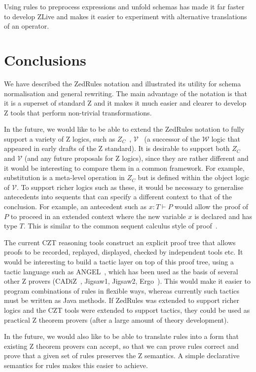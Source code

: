 \documentclass{entcs}
\newcommand{\V}{\mathcal{V}}
\newcommand{\Zc}{Z_C}
\begin{document}
Using rules to preprocess expressions and unfold schemas has made it
far faster to develop ZLive and makes it easier to experiment with
alternative translations of an operator.




\section{Conclusions} \label{sec:concl}

We have described the ZedRules notation and illustrated its utility
for schema normalisation and general rewriting.  The main advantage
of the notation is that it is a superset of standard Z and it makes it
much easier and clearer to develop Z tools that perform non-trivial
transformations.


In the future, we would like to be able to extend the ZedRules
notation to fully support a variety of Z logics, such as
$\Zc$~\cite{henson:revising-z-1-99,henson:revising-z-2-99},
$\V$~\cite{brien:calculus-schemas-z00} (a successor of the
$\mathcal{W}$ logic that appeared in early drafts of the Z standard).
It is desirable to support both $\Zc$ and $\V$ (and any future
proposals for Z logics), since they are rather different and it would
be interesting to compare them in a common framework.  For example,
substitution is a meta-level operation in $\Zc$ but is defined within
the object logic of $\V$.  To support richer logics such as these, it
would be necessary to generalise antecedents into sequents that can
specify a different context to that of the conclusion.  For example,
an antecedent such as $x:T \vdash P$ would allow the proof of $P$ to
proceed in an extended context where the new variable $x$ is declared
and has type $T$.  This is similar to the common sequent calculus
style of proof~\cite{girard:proofs-types90}.

The current CZT reasoning tools construct an explicit proof tree that
allows proofs to be recorded, replayed, displayed, checked by independent
tools etc.
It would be interesting to build a tactic layer on top of this proof
tree, using a tactic language such as ANGEL~\cite{martin:tactics}, which
has been used as the basis of several other Z provers
(CADiZ~\cite{Toyn98a}, Jigsaw1, Jigsaw2,
Ergo~\cite{martin:tac-lang-for-ergo}).
This would make it easier to program combinations of rules 
in flexible ways, whereas currently such tactics must be written as
Java methods.
If ZedRules was extended to support richer logics and the CZT tools were 
extended to support tactics, they could be used as practical Z theorem
provers (after a large amount of theory development).

In the future, we would also like to be able to translate rules
into a form that existing Z theorem provers can accept, so that we can prove
rules correct and prove that a given set of rules preserves the Z
semantics.  A simple declarative semantics for rules makes this
easier to achieve.



\end{document}
